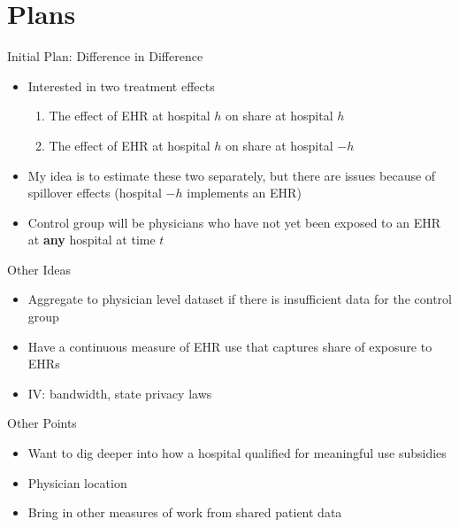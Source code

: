 \documentclass[10pt]{beamer}
\begin{document}
\section{Plans}

\begin{frame}{Initial Plan: Difference in Difference}
\begin{itemize}
    \item Interested in two treatment effects
    \begin{enumerate}
        \item The effect of EHR at hospital $h$ on share at hospital $h$
        \item The effect of EHR at hospital $h$ on share at hospital $-h$
    \end{enumerate}
    
    \vspace{2mm}
    
    \item My idea is to estimate these two separately, but there are issues because of spillover effects (hospital $-h$ implements an EHR)
    
    \vspace{2mm}
    
    \item Control group will be physicians who have not yet been exposed to an EHR at \textbf{any} hospital at time $t$
\end{itemize}
\end{frame}

\begin{frame}{Other Ideas}
\begin{itemize}
    \item Aggregate to physician level dataset if there is insufficient data for the control group
    \item Have a continuous measure of EHR use that captures share of exposure to EHRs
    \item IV: bandwidth, state privacy laws
\end{itemize}
\end{frame}

\begin{frame}{Other Points}
\begin{itemize}
    \item Want to dig deeper into how a hospital qualified for meaningful use subsidies
    \item Physician location
    \item Bring in other measures of work from shared patient data
\end{itemize}
    
\end{frame}
\end{document}
